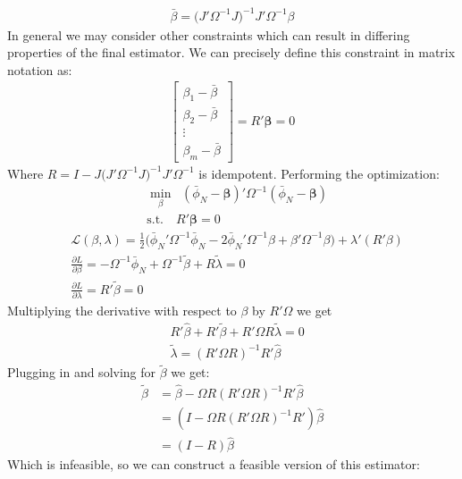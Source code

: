 \documentclass[12pt]{article}
\begin{document}
\begin{outline}[enumerate]
\begin{align*}
						\bar{\beta} = \big(J'\Omega^{-1}J\big)^{-1} J'\Omega^{-1}\beta
					\end{align*}
					In general we may consider other constraints which can result in differing properties of the final estimator. 
				\4 We can precisely define this constraint in matrix notation as:
					\begin{align*}
						\begin{bmatrix}
						\beta_1-\bar{\beta}\\
						\beta_2 - \bar{\beta}\\
						\vdots \\
						\beta_{m} - \bar{\beta}
						\end{bmatrix} = R'\pmb{\beta} = 0
					\end{align*}
					Where $R = I - J\big(J'\Omega^{-1}J\big)^{-1} J'\Omega^{-1} $ is idempotent.
			\3 Performing the optimization:
			\begin{align*}
				&\underset{\beta}{\min} \;\;(\bar{\phi}_N - \pmb{\beta})'\Omega^{-1}(\bar{\phi}_N - \pmb{\beta})\\
				& \text{s.t.} \quad  R'\pmb{\beta} = 0
			\end{align*}
			\begin{align*}
				&\mathcal{L}(\beta,\lambda) = \frac{1}{2}\big(\bar{\phi}_N'\Omega^{-1}\bar{\phi}_N - 2\bar{\phi}_N'\Omega^{-1}\beta + \beta'\Omega^{-1}\beta\big) + \lambda'(R'\beta)\\
				&\frac{\partial{L}}{\partial\beta} = -\Omega^{-1}\bar{\phi}_N + \Omega^{-1}\tilde{\beta} + R\tilde{\lambda} = 0\\
				&\frac{\partial{L}}{\partial\lambda} = R'\tilde{\beta} = 0
			\end{align*}
			Multiplying the derivative with respect to $\beta$ by $R'\Omega$ we get
			\begin{align*}
				&R'\hat{\beta} + R'\tilde{\beta} + R'\Omega R\tilde{\lambda} = 0\\
				&\tilde{\lambda} = (R'\Omega R)^{-1} R'\hat{\beta}
			\end{align*}
			Plugging in and solving for $\tilde{\beta}$ we get:
			\begin{align*}
				\tilde{\beta} &= \hat{\beta} - \Omega R (R'\Omega R)^{-1} R' \hat{\beta}\\
				&= (I-\Omega R (R'\Omega R)^{-1} R')\hat{\beta}\\
				&= (I-R)\hat{\beta}
			\end{align*}
			Which is infeasible, so we can construct a feasible version of this estimator:

\end{outline}
\end{document}
